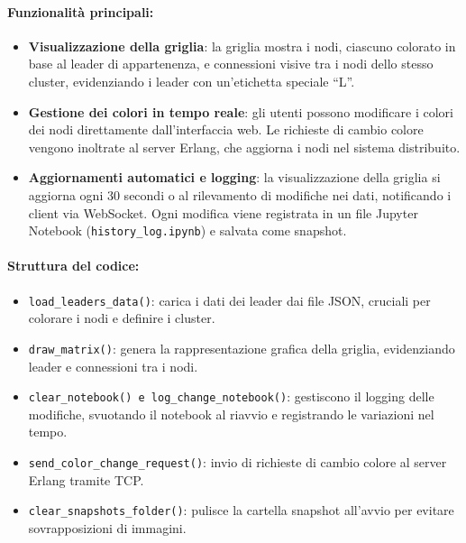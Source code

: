 \documentclass[12pt, a4paper]{report}
\begin{document}
\paragraph{Funzionalità principali:}
\begin{itemize}
    \item \textbf{Visualizzazione della griglia}: la griglia mostra i nodi, ciascuno colorato in base al leader di appartenenza, e connessioni visive tra i nodi dello stesso cluster, evidenziando i leader con un'etichetta speciale ``L''.
    \item \textbf{Gestione dei colori in tempo reale}: gli utenti possono modificare i colori dei nodi direttamente dall'interfaccia web. Le richieste di cambio colore vengono inoltrate al server Erlang, che aggiorna i nodi nel sistema distribuito.
    \item \textbf{Aggiornamenti automatici e logging}: la visualizzazione della griglia si aggiorna ogni 30 secondi o al rilevamento di modifiche nei dati, notificando i client via WebSocket. Ogni modifica viene registrata in un file Jupyter Notebook (\texttt{history\_log.ipynb}) e salvata come snapshot.
\end{itemize}

\paragraph{Struttura del codice:}
\begin{itemize}
    \item \texttt{load\_leaders\_data()}: carica i dati dei leader dai file JSON, cruciali per colorare i nodi e definire i cluster.
    \item \texttt{draw\_matrix()}: genera la rappresentazione grafica della griglia, evidenziando leader e connessioni tra i nodi.
    \item \texttt{clear\_notebook() e log\_change\_notebook()}: gestiscono il logging delle modifiche, svuotando il notebook al riavvio e registrando le variazioni nel tempo.
    \item \texttt{send\_color\_change\_request()}: invio di richieste di cambio colore al server Erlang tramite TCP.
    \item \texttt{clear\_snapshots\_folder()}: pulisce la cartella snapshot all’avvio per evitare sovrapposizioni di immagini.
\end{itemize}
\end{document}
